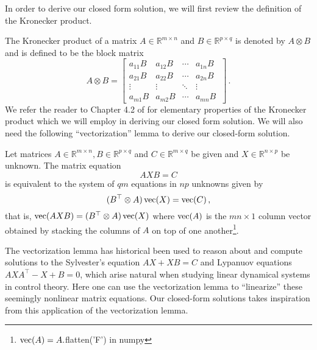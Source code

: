 In order to derive our closed form solution, we will first review the definition of the Kronecker product. 
\begin{definition}
    The Kronecker product of a matrix $A \in \mathbb{R}^{m\times n}$ and $B \in \mathbb{R}^{p\times q}$ is denoted by $A \otimes B$ and is defined to be the block matrix
    \begin{equation*}
        A\otimes B = 
        \begin{bmatrix}
        a_{11}B & a_{12}B & \cdots & a_{1n}B \\
        a_{21}B & a_{22}B & \cdots & a_{2n}B \\
        \vdots  & \vdots  & \ddots & \vdots  \\
        a_{m1}B & a_{m2}B & \cdots & a_{mn}B\
        \end{bmatrix}\,.
    \end{equation*}
    We refer the reader to Chapter 4.2 of \citet{Horn_Johnson_1991} for elementary properties of the Kronecker product which we will employ in deriving our closed form solution. We will also need the following ``vectorization'' lemma to derive our closed-form solution.
    \begin{lemma}[Lemma 4.3.1 of \citet{Horn_Johnson_1991}]\label{lem:vectorization}
        Let matrices $A \in \mathbb{R}^{m\times n},B \in \mathbb{R}^{p\times q}$ and $C \in \mathbb{R}^{m \times q}$ be given and $X \in \mathbb{R}^{n \times p}$ be unknown. The matrix equation
        \begin{equation*}
            AXB = C
        \end{equation*}
        is equivalent to the system of $qm$ equations in $np$ unknowns given by
        \begin{equation*}
            (B^\top \otimes A)\operatorname{vec}(X) = \operatorname{vec}(C)\,,
        \end{equation*}
        that is, $\operatorname{vec}(AXB) = (B^\top \otimes A)\operatorname{vec}(X)$ where $\operatorname{vec}(A)$ is the $mn\times 1$ column vector obtained by stacking the columns of $A$ on top of one another\footnote{$\operatorname{vec}(A)=A.$flatten('F') in numpy}.
    \end{lemma}
\end{definition}
The vectorization lemma has historical been used to reason about and compute solutions to the Sylvester's equation $AX + XB = C$ and Lypanuov equations $AXA^\top - X + B = 0$, which arise natural when studying linear dynamical systems in control theory. Here one can use the vectorization lemma to ``linearize'' these seemingly nonlinear matrix equations. Our closed-form solutions takes inspiration from this application of the vectorization lemma.

